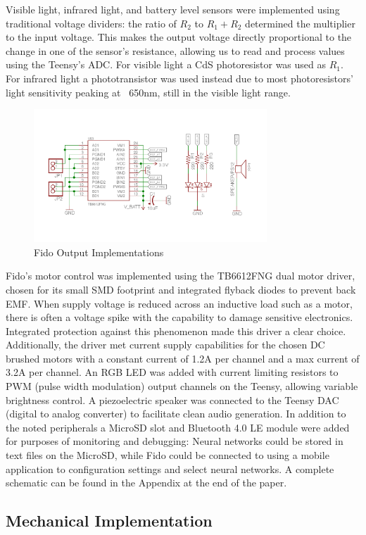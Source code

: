Visible light, infrared light, and battery level sensors were implemented using traditional voltage dividers: the ratio of $R_2$ to $R_1 + R_2$ determined the multiplier to the input voltage.  This makes the output voltage directly proportional to the change in one of the sensor's resistance, allowing us to read and process values using the Teensy's ADC.  For visible light a CdS photoresistor was used as $R_1$.  For infrared light a phototransistor was used instead due to most photoresistors' light sensitivity peaking at ~650nm, still in the visible light range.

\begin{figure}[ht]
	\centering
	\includegraphics[height=5cm]{Figures/outDiagram.png}
	\caption{Fido Output Implementations}
\end{figure}

Fido's motor control was implemented using the TB6612FNG dual motor driver, chosen for its small SMD footprint and integrated flyback diodes to prevent back EMF.  When supply voltage is reduced across an inductive load such as a motor, there is often a voltage spike with the capability to damage sensitive electronics.  Integrated protection against this phenomenon made this driver a clear choice.  Additionally, the driver met current supply capabilities for the chosen DC brushed motors with a constant current of 1.2A per channel and a max current of 3.2A per channel.  An RGB LED was added with current limiting resistors to PWM (pulse width modulation) output channels on the Teensy, allowing variable brightness control.  A piezoelectric speaker was connected to the Teensy DAC (digital to analog converter) to facilitate clean audio generation.  In addition to the noted peripherals a MicroSD slot and Bluetooth 4.0 LE module were added for purposes of monitoring and debugging: Neural networks could be stored in text files on the MicroSD, while Fido could be connected to using a mobile application to configuration settings and select neural networks.  A complete schematic can be found in the Appendix at the end of the paper.

\subsection{Mechanical Implementation}